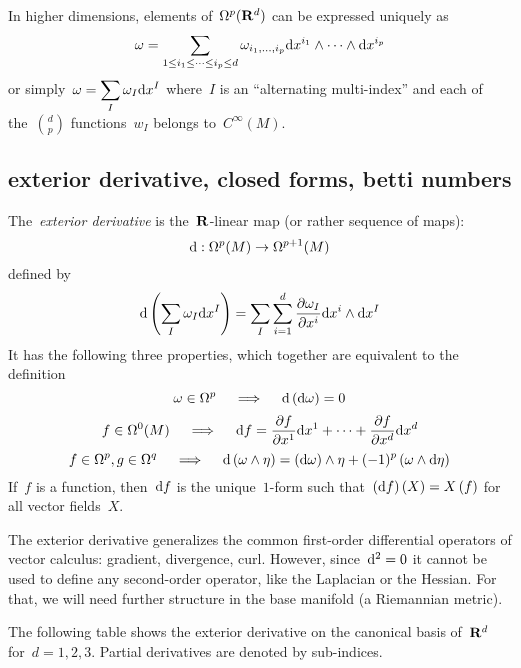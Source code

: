In higher dimensions, elements of~$\Omega^p(\mathbf{R}^d)$ can be expressed uniquely
as
\[
	\omega  =
	\sum_{1\le i_1\le\cdots\le i_p\le d}
	\omega_{i_1,\ldots,i_p} \mathrm{d} x^{i_1}\wedge\cdots\wedge\mathrm{d} x^{i_p}
\]
or simply~$\displaystyle\omega=\sum_I\omega_I\mathrm{d} x^I$
where~$I$ is an ``alternating multi-index'' and each of the~${d\choose p}$
functions~$w_I$ belongs to~$C^\infty(M)$.

\subsection{exterior derivative, closed forms, betti numbers}

The~\emph{exterior derivative} is the~$\mathbf{R}$-linear map (or rather sequence of maps):
\[
	\mathrm{d} :\Omega^p(M) \to \Omega^{p+1}(M)
\]
defined by
\[
	\mathrm{d}\left( \sum_I\omega_I\mathrm{d} x^I \right)
=\sum_I \sum_{i=1}^d\frac{\partial\omega_I}{\partial x^i}\mathrm{d} x^i
	\wedge\mathrm{d} x^I
\]
It has the following three properties, which together are equivalent to the
definition
\[
	\omega\in\Omega^p
	\quad\implies\quad
	\mathrm{d}\left(\mathrm{d}\omega\right)=0
\]
\[
	f\in\Omega^0(M)
	\quad\implies\quad
	\mathrm{d} f =
	\frac{\partial f}{\partial x^1}\mathrm{d} x^1
	+\cdots+
	\frac{\partial f}{\partial x^d}\mathrm{d} x^d
\]
\[
	f\in\Omega^p,g\in\Omega^q
	\quad\implies\quad
	\mathrm{d}\left(\omega\wedge\eta\right)
	=
	\left(\mathrm{d}\omega\right)\wedge\eta
	+
	(-1)^p
	\left(
		\omega\wedge\mathrm{d}\eta
	\right)
\]
If~$f$ is a function, then~$\mathrm{d} f$ is the unique~$1$-form such
that~$\left(\mathrm{d} f\right)(X)=X\left(f\right)$ for all vector fields~$X$.

The exterior derivative generalizes the common first-order differential
operators of vector calculus: gradient, divergence, curl.  However,
since~$\mathrm{d}^2=0$ it cannot be used to define any second-order operator, like
the Laplacian or the Hessian.  For that, we will need further structure in
the base manifold (a Riemannian metric).

The following table shows the exterior derivative on the canonical basis
of~$\mathbf{R}^d$ for~$d=1,2,3$.  Partial derivatives are denoted by sub-indices.

